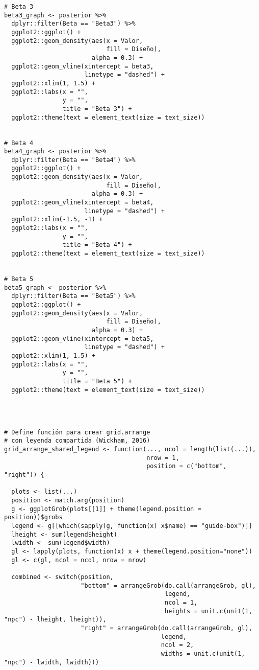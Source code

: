 \begin{lstlisting}
# Beta 3
beta3_graph <- posterior %>% 
  dplyr::filter(Beta == "Beta3") %>% 
  ggplot2::ggplot() + 
  ggplot2::geom_density(aes(x = Valor,
                            fill = Diseño),
                        alpha = 0.3) +
  ggplot2::geom_vline(xintercept = beta3,
                      linetype = "dashed") + 
  ggplot2::xlim(1, 1.5) +
  ggplot2::labs(x = "",
                y = "",
                title = "Beta 3") +
  ggplot2::theme(text = element_text(size = text_size))


# Beta 4
beta4_graph <- posterior %>% 
  dplyr::filter(Beta == "Beta4") %>% 
  ggplot2::ggplot() + 
  ggplot2::geom_density(aes(x = Valor,
                            fill = Diseño),
                        alpha = 0.3) +
  ggplot2::geom_vline(xintercept = beta4,
                      linetype = "dashed") + 
  ggplot2::xlim(-1.5, -1) +
  ggplot2::labs(x = "",
                y = "",
                title = "Beta 4") +
  ggplot2::theme(text = element_text(size = text_size))
  

# Beta 5
beta5_graph <- posterior %>% 
  dplyr::filter(Beta == "Beta5") %>% 
  ggplot2::ggplot() + 
  ggplot2::geom_density(aes(x = Valor,
                            fill = Diseño),
                        alpha = 0.3) +
  ggplot2::geom_vline(xintercept = beta5,
                      linetype = "dashed") + 
  ggplot2::xlim(1, 1.5) +
  ggplot2::labs(x = "",
                y = "",
                title = "Beta 5") +
  ggplot2::theme(text = element_text(size = text_size))




# Define función para crear grid.arrange 
# con leyenda compartida (Wickham, 2016)
grid_arrange_shared_legend <- function(..., ncol = length(list(...)), 
                                       nrow = 1, 
                                       position = c("bottom", "right")) {
  
  plots <- list(...)
  position <- match.arg(position)
  g <- ggplotGrob(plots[[1]] + theme(legend.position = position))$grobs
  legend <- g[[which(sapply(g, function(x) x$name) == "guide-box")]]
  lheight <- sum(legend$height)
  lwidth <- sum(legend$width)
  gl <- lapply(plots, function(x) x + theme(legend.position="none"))
  gl <- c(gl, ncol = ncol, nrow = nrow)
  
  combined <- switch(position,
                     "bottom" = arrangeGrob(do.call(arrangeGrob, gl),
                                            legend,
                                            ncol = 1,
                                            heights = unit.c(unit(1, "npc") - lheight, lheight)),
                     "right" = arrangeGrob(do.call(arrangeGrob, gl),
                                           legend,
                                           ncol = 2,
                                           widths = unit.c(unit(1, "npc") - lwidth, lwidth)))
  

\end{lstlisting}
